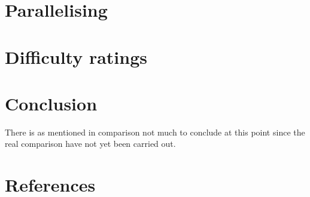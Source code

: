 \documentclass[a4paper,11pt]{kth-mag}
\begin{document}
\section{Parallelising}

\section{Difficulty ratings}


\section{Conclusion}

There is as mentioned in comparison not much to conclude at this point since the real comparison have not yet been carried out.


\section{References}
\end{document}
